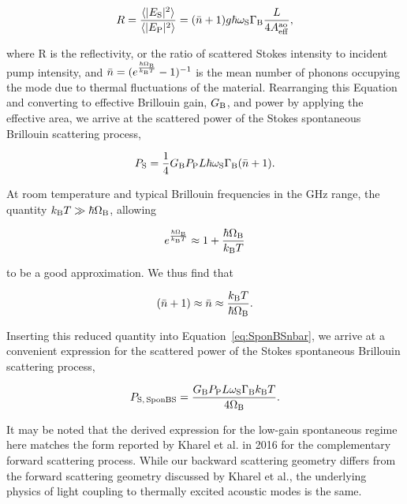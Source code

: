 \begin{equation}
  R = \frac{\langle|E_{\rm S}|^{2}\rangle}{\langle|E_{\rm P}|^{2}\rangle} = (\bar{n} + 1)g\hbar\omega_{\rm S}\Gamma_{\rm B}\frac{L}{4A_{\rm eff}^{\rm ao}},
\end{equation}

where R is the reflectivity, or the ratio of scattered Stokes intensity to incident pump intensity, and \(\bar{n} = (e^{\frac{\hbar\Omega_{\rm B}}{k_{\rm B}T}} - 1)^{-1}\) is the mean number of phonons occupying the mode due to thermal fluctuations of the material. \cite{kittel1980thermal} Rearranging this Equation and converting to effective Brillouin gain, \(G_{\rm B}\), and power by applying the effective area, we arrive at the scattered power of the Stokes spontaneous Brillouin scattering process,

\begin{equation}
  P_{\rm S} = \frac{1}{4}G_{\rm B}P_{\rm P}L\hbar\omega_{\rm S}\Gamma_{\rm B}(\bar{n} + 1).
  \label{eq:SponBSnbar}
\end{equation}

At room temperature and typical Brillouin frequencies in the GHz range, the quantity \(k_{\rm B}T \gg \hbar\Omega_{\rm B}\), allowing

\begin{equation}
e^{\frac{\hbar\Omega_{\rm B}}{k_{\rm B}T}} \approx 1 + \frac{\hbar\Omega_{\rm B}}{k_{\rm B}T}
\end{equation}

to be a good approximation. We thus find that

\begin{equation}
(\bar{n} + 1) \approx \bar{n} \approx \frac{k_{\rm B}T}{\hbar\Omega_{\rm B}}.
\end{equation}

Inserting this reduced quantity into Equation~\ref{eq:SponBSnbar}, we arrive at a convenient expression for the scattered power of the Stokes spontaneous Brillouin scattering process,

\begin{equation}
  P_{\rm S,\,SponBS} = \frac{G_{\rm B}P_{\rm P}L\omega_{\rm S}\Gamma_{\rm B}k_{\rm B}T}{4\Omega_{\rm B}}.
  \label{eq:sponBSscatteredPower}
\end{equation}

It may be noted that the derived expression for the low-gain spontaneous regime here matches the form reported by Kharel et al. in 2016 \cite{kharel2016noise} for the complementary forward scattering process. While our backward scattering geometry differs from the forward scattering geometry discussed by Kharel et al., the underlying physics of light coupling to thermally excited acoustic modes is the same.

